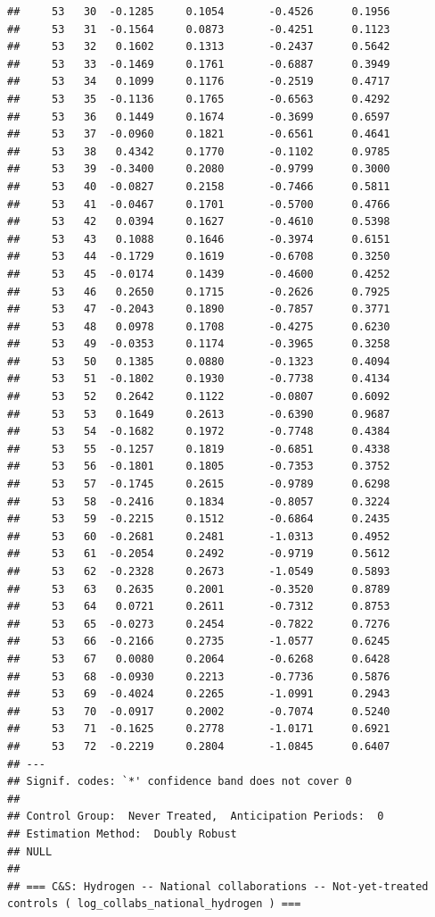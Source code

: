 \documentclass[
]{article}
\begin{document}
\begin{verbatim}
##     53   30  -0.1285     0.1054       -0.4526      0.1956  
##     53   31  -0.1564     0.0873       -0.4251      0.1123  
##     53   32   0.1602     0.1313       -0.2437      0.5642  
##     53   33  -0.1469     0.1761       -0.6887      0.3949  
##     53   34   0.1099     0.1176       -0.2519      0.4717  
##     53   35  -0.1136     0.1765       -0.6563      0.4292  
##     53   36   0.1449     0.1674       -0.3699      0.6597  
##     53   37  -0.0960     0.1821       -0.6561      0.4641  
##     53   38   0.4342     0.1770       -0.1102      0.9785  
##     53   39  -0.3400     0.2080       -0.9799      0.3000  
##     53   40  -0.0827     0.2158       -0.7466      0.5811  
##     53   41  -0.0467     0.1701       -0.5700      0.4766  
##     53   42   0.0394     0.1627       -0.4610      0.5398  
##     53   43   0.1088     0.1646       -0.3974      0.6151  
##     53   44  -0.1729     0.1619       -0.6708      0.3250  
##     53   45  -0.0174     0.1439       -0.4600      0.4252  
##     53   46   0.2650     0.1715       -0.2626      0.7925  
##     53   47  -0.2043     0.1890       -0.7857      0.3771  
##     53   48   0.0978     0.1708       -0.4275      0.6230  
##     53   49  -0.0353     0.1174       -0.3965      0.3258  
##     53   50   0.1385     0.0880       -0.1323      0.4094  
##     53   51  -0.1802     0.1930       -0.7738      0.4134  
##     53   52   0.2642     0.1122       -0.0807      0.6092  
##     53   53   0.1649     0.2613       -0.6390      0.9687  
##     53   54  -0.1682     0.1972       -0.7748      0.4384  
##     53   55  -0.1257     0.1819       -0.6851      0.4338  
##     53   56  -0.1801     0.1805       -0.7353      0.3752  
##     53   57  -0.1745     0.2615       -0.9789      0.6298  
##     53   58  -0.2416     0.1834       -0.8057      0.3224  
##     53   59  -0.2215     0.1512       -0.6864      0.2435  
##     53   60  -0.2681     0.2481       -1.0313      0.4952  
##     53   61  -0.2054     0.2492       -0.9719      0.5612  
##     53   62  -0.2328     0.2673       -1.0549      0.5893  
##     53   63   0.2635     0.2001       -0.3520      0.8789  
##     53   64   0.0721     0.2611       -0.7312      0.8753  
##     53   65  -0.0273     0.2454       -0.7822      0.7276  
##     53   66  -0.2166     0.2735       -1.0577      0.6245  
##     53   67   0.0080     0.2064       -0.6268      0.6428  
##     53   68  -0.0930     0.2213       -0.7736      0.5876  
##     53   69  -0.4024     0.2265       -1.0991      0.2943  
##     53   70  -0.0917     0.2002       -0.7074      0.5240  
##     53   71  -0.1625     0.2778       -1.0171      0.6921  
##     53   72  -0.2219     0.2804       -1.0845      0.6407  
## ---
## Signif. codes: `*' confidence band does not cover 0
## 
## Control Group:  Never Treated,  Anticipation Periods:  0
## Estimation Method:  Doubly Robust
## NULL
## 
## === C&S: Hydrogen -- National collaborations -- Not-yet-treated controls ( log_collabs_national_hydrogen ) ===
\end{verbatim}
\end{document}
